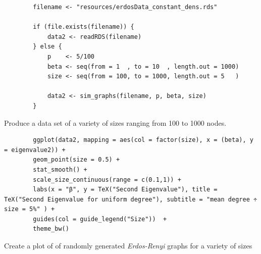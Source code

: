 \documentclass[11pt, twoside]{report}
\begin{document}
\begin{listing}[htbp]
    \begin{tcolorbox}
        \begin{verbatim}
        filename <- "resources/erdosData_constant_dens.rds"

        if (file.exists(filename)) {
            data2 <- readRDS(filename)
        } else {
            p    <- 5/100
            beta <- seq(from = 1  , to = 10  , length.out = 1000)
            size <- seq(from = 100, to = 1000, length.out = 5   )

            data2 <- sim_graphs(filename, p, beta, size)
        }
        \end{verbatim}
    \end{tcolorbox}
\caption{\label{l:gen_erdos_data_constant_dens}Produce a data set of a variety of sizes ranging from 100 to 1000 nodes.}
\end{listing}

\begin{listing}[htbp]
    \begin{tcolorbox}
        \begin{verbatim}
        ggplot(data2, mapping = aes(col = factor(size), x = (beta), y = eigenvalue2)) +
        geom_point(size = 0.5) +
        stat_smooth() +
        scale_size_continuous(range = c(0.1,1)) +
        labs(x = "β", y = TeX("Second Eigenvalue"), title = TeX("Second Eigenvalue for uniform degree"), subtitle = "mean degree ÷ size = 5%" ) +
        guides(col = guide_legend("Size"))  +
        theme_bw()
        \end{verbatim}
    \end{tcolorbox}
\caption{\label{constant_dens_erdos_density}Create a plot of of randomly generated \textit{Erdos-Renyi} graphs for a variety of sizes}
\end{listing}
\end{document}
